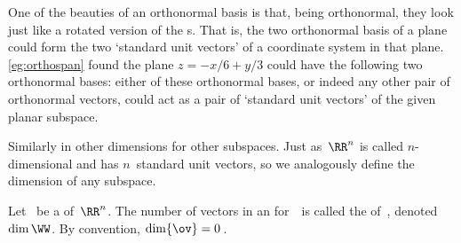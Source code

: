 One of the beauties of an orthonormal basis is that, being orthonormal, they look just like a rotated version of the s.
That is, the two orthonormal basis of a plane could form the two `standard unit vectors' of a coordinate system in that plane.
\autoref{eg:orthospan} found the plane \(z=-x/6+y/3\) could have the following two orthonormal bases: either of these orthonormal bases, or indeed any other pair of orthonormal vectors, could act as a pair of `standard unit vectors' of the given planar subspace.
\begin{center}
\quad
{} 
\end{center}
Similarly in other dimensions for other subspaces.
Just as~\(\RR^n\) is called \(n\)-dimensional and has \(n\)~standard unit vectors, so we analogously define the dimension of any subspace.

\begin{definition} \label{def:dim} 
Let \WW\ be a  of~\(\RR^n\). 
The number of vectors in an  for~\WW\ is called the  of~\WW, denoted~\(\dim\WW\).
By convention, \(\dim\{\ov\}=0\)\,.
\end{definition}

